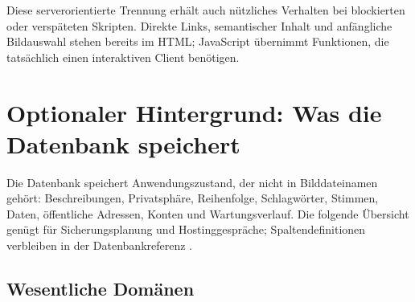 \documentclass[11pt,a4paper]{article}
\begin{document}
Diese serverorientierte Trennung erhält auch nützliches Verhalten bei
blockierten oder verspäteten Skripten. Direkte Links, semantischer Inhalt und
anfängliche Bildauswahl stehen bereits im HTML; JavaScript übernimmt Funktionen,
die tatsächlich einen interaktiven Client benötigen.

\section{Optionaler Hintergrund: Was die Datenbank speichert}
\label{sec:database}

Die Datenbank speichert Anwendungszustand, der nicht in Bilddateinamen gehört:
Beschreibungen, Privatsphäre, Reihenfolge, Schlagwörter, Stimmen, Daten,
öffentliche Adressen, Konten und Wartungsverlauf. Die folgende Übersicht genügt
für Sicherungsplanung und Hostinggespräche; Spaltendefinitionen verbleiben in
der Datenbankreferenz \cite{database}.

\subsection{Wesentliche Domänen}
\end{document}
